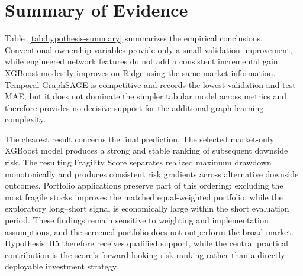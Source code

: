 \section{Summary of Evidence}
\label{sec:results_summary}

Table~\ref{tab:hypothesis-summary} summarizes the empirical conclusions. Conventional ownership variables provide only a small validation improvement, while engineered network features do not add a consistent incremental gain. XGBoost modestly improves on Ridge using the same market information. Temporal GraphSAGE is competitive and records the lowest validation and test MAE, but it does not dominate the simpler tabular model across metrics and therefore provides no decisive support for the additional graph-learning complexity.



\noindent
The clearest result concerns the final prediction. The selected market-only XGBoost model produces a strong and stable ranking of subsequent downside risk. The resulting Fragility Score separates realized maximum drawdown monotonically and produces consistent risk gradients across alternative downside outcomes. Portfolio applications preserve part of this ordering: excluding the most fragile stocks improves the matched equal-weighted portfolio, while the exploratory long--short signal is economically large within the short evaluation period. These findings remain sensitive to weighting and implementation assumptions, and the screened portfolio does not outperform the broad market. Hypothesis~H5 therefore receives qualified support, while the central practical contribution is the score's forward-looking risk ranking rather than a directly deployable investment strategy.
